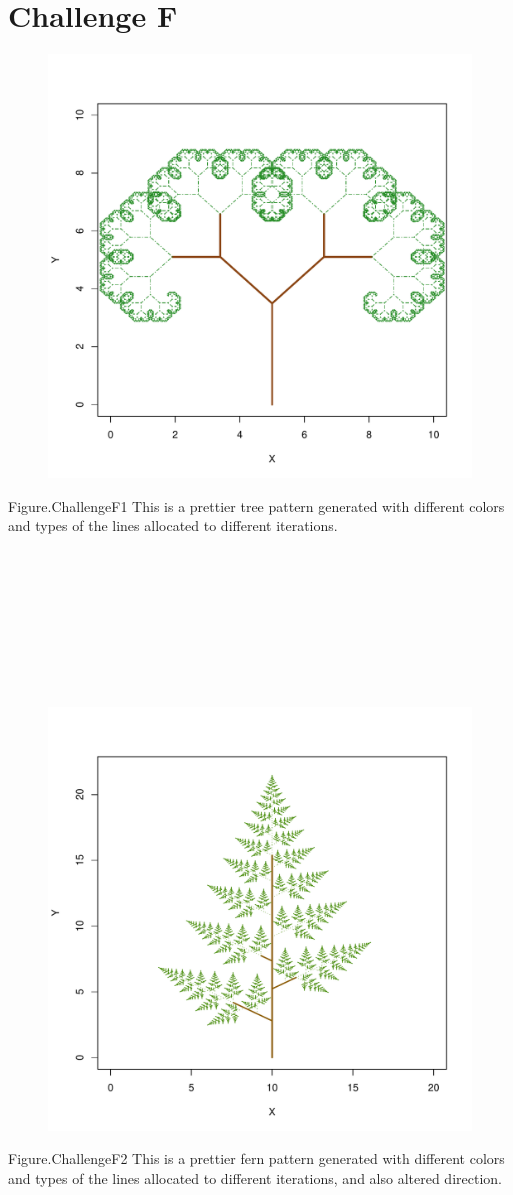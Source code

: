 \documentclass[12pt,a4paper]{article}
\begin{document}
\section{Challenge F}
\begin{figure}[h]
\centering
\includegraphics[width=\textwidth]{challengeF1.pdf}
\end{figure}
Figure.ChallengeF1 This is a prettier tree pattern generated with different colors and types of the lines allocated to different iterations.
\\
\\
\\
\\
\\
\\
\\
\\
\\
\begin{figure}[t]
\centering
\includegraphics[width=\textwidth]{challengeF2.pdf}
\end{figure}
Figure.ChallengeF2 This is a prettier fern pattern generated with different colors and types of the lines allocated to different iterations, and also altered direction.
\end{document}
